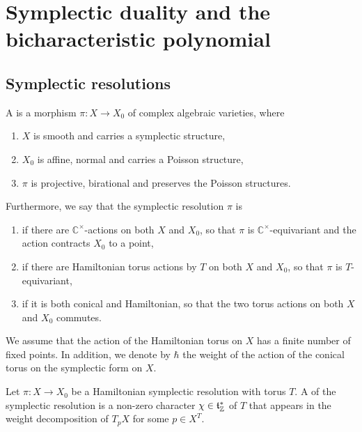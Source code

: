 \section{Symplectic duality and the bicharacteristic polynomial}
\label{chapter_symplectic_duality}

\subsection{Symplectic resolutions}

\begin{definition}[def:]{}
    A  is a morphism $\pi : X \to X_0$ of complex algebraic varieties, where
    \begin{enumerate}
        \item $X$ is smooth and carries a symplectic structure,
        \item $X_0$ is affine, normal and carries a Poisson structure,
        \item $\pi$ is projective, birational and preserves the Poisson structures.
    \end{enumerate}
    Furthermore, we say that the symplectic resolution $\pi$ is
    \begin{enumerate}
        \item {} if there are $\mathbb{C}^\times$-actions on both $X$ and $X_0$, so that $\pi$ is $\mathbb{C}^\times$-equivariant and the action contracts $X_0$ to a point,
        \item {} if there are Hamiltonian torus actions by $T$ on both $X$ and $X_0$, so that $\pi$ is $T$-equivariant,
        \item {} if it is both conical and Hamiltonian, so that the two torus actions on both $X$ and $X_0$ commutes.
    \end{enumerate}
    \begin{remark}
        We assume that the action of the Hamiltonian torus on $X$ has a finite number of fixed points. In addition, we denote by $\hbar$ the weight of the action of the conical torus on the symplectic form on $X$.
    \end{remark}
\end{definition}
\begin{definition}{}
    Let $\pi : X \to X_0$ be a Hamiltonian symplectic resolution with torus $T$. A  of the symplectic resolution is a non-zero character $\chi \in \mathfrak{t}^*_\mathbb{Z}$ of $T$ that appears in the weight decomposition of $T_pX$ for some $p \in X^T$.
\end{definition}
